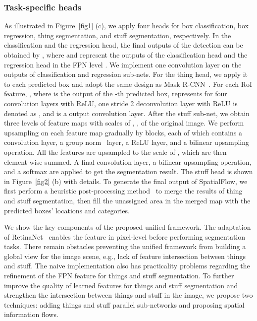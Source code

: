 \documentclass[journal,final]{IEEEtran}
\begin{document}
\subsubsection{Task-specific heads} 
As illustrated in Figure~\ref{fig1} (c), we apply four heads for box classification, box regression, thing segmentation, and stuff segmentation, respectively. In the classification and the regression head, the final outputs of the detection can be obtained by , where  and  represent the outputs of the classification head and the regression head in the FPN level . We implement one  convolution layer  on the outputs of classification and regression sub-nets. For the thing head, we apply it to each predicted box and adopt the same design as Mask R-CNN~\cite{maskrcnn}. For each RoI feature, , where  is the output of the -th predicted box,  represents for four  convolution layers with ReLU, one  stride 2 deconvolution layer with ReLU is denoted as , and  is a  output convolution layer. After the stuff sub-net, we obtain three levels of feature maps with scales of , ,  of the original image. We perform upsampling on each feature map gradually by blocks, each of which contains a  convolution layer, a group norm~\cite{groupnorm} layer, a ReLU layer, and a  bilinear upsampling operation. All the features are upsampled to the scale of , which are then element-wise summed. A final  convolution layer, a  bilinear upsampling operation, and a softmax are applied to get the segmentation result. The stuff head is shown in Figure~\ref{fig2} (b) with details. To generate the final output of SpatialFlow, we first perform a heuristic post-processing method~\cite{panopticfpn} to merge the results of thing and stuff segmentation, then fill the unassigned area in the merged map with the predicted boxes' locations and categories.

We show the key components of the proposed unified framework. The adaptation of RetinaNet~\cite{retinanet} enables the feature in pixel-level before performing segmentation tasks. There remain obstacles preventing the unified framework from building a global view for the image scene, e.g., lack of feature intersection between things and stuff. The naive implementation also has practicality problems regarding the refinement of the FPN feature for things and stuff segmentation. To further improve the quality of learned features for things and stuff segmentation and strengthen the intersection between things and stuff in the image, we propose two techniques: adding things and stuff parallel sub-networks and proposing spatial information flows.
\end{document}
